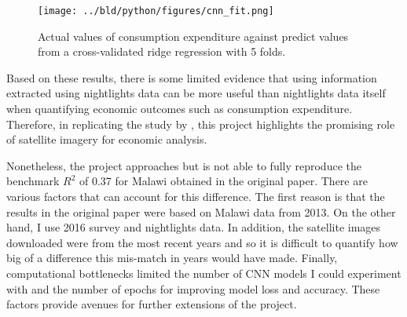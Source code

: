 \documentclass[11pt, a4paper, leqno]{article}
\begin{document}
\begin{figure}[H]
\centering
    \texttt{[image: ../bld/python/figures/cnn\_fit.png]}
    \caption{Actual values of consumption expenditure against predict values from a cross-validated ridge regression with 5 folds.}
    \label{fig:python-predictions}
\end{figure}

Based on these results, there is some limited evidence that using information extracted using nightlights data can be more useful than nightlights data itself when quantifying economic outcomes such as consumption expenditure. Therefore, in replicating the study by \citet{jean2016combining}, this project highlights the promising role of satellite imagery for economic analysis. 

 Nonetheless, the project approaches but is not able to fully reproduce the benchmark $R^2$ of 0.37 for Malawi obtained in the original paper. There are various factors that can account for this difference. The first reason is that the results in the original paper were based on Malawi data from 2013. On the other hand, I use 2016 survey and nightlights data. In addition, the satellite images downloaded were from the most recent years and so it is difficult to quantify how big of a difference this mis-match in years would have made. Finally, computational bottlenecks limited the number of CNN models I could experiment with and the number of epochs for improving model loss and accuracy. These factors provide avenues for further extensions of the project. 

\printbibliography
{}
\end{document}
